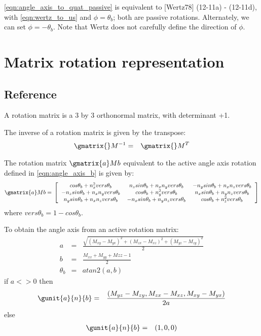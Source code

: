 \documentclass{book}
\numberwithin{equation}{subsection}
\begin{document}
\ref{eqn:angle_axis_to_quat_passive} is equivalent to [Wertz78]
(12-11a) - (12-11d), with \ref{eqn:wertz_to_us} and $\phi = \theta_b$;
both are passive rotations. Alternately, we can set $\phi = -
\theta_b$. Note that Wertz does not carefully define the direction of
$\phi$.

\section{Matrix rotation representation}
\subsection{Reference}
A rotation matrix is a 3 by 3 orthonormal matrix, with determinant +1.

The inverse of a rotation matrix is given by the transpose:
\begin{eqnarray}
\gmatrix{}M{}^{-1} &=& \gmatrix{}M{}^T 
\end{eqnarray}

The rotation matrix $\gmatrix{a}M{b}$ equivalent to the active angle axis rotation
defined in \ref{eqn:angle_axis_b} is given by:
\begin{equation}
\gmatrix{a}M{b} = \\
    \left[
        \begin{tabular}{ccc}
            $cos \theta_b + n_x^2 vers \theta_b$ &
            $n_z sin \theta_b + n_x n_y vers \theta_b$ &
            $- n_y sin \theta_b + n_x n_z vers \theta_b$ \\
            $- n_z sin \theta_b + n_x n_y vers \theta_b$ &
            $cos \theta_b + n_y^2 vers \theta_b$ &
            $n_x sin \theta_b + n_y n_z vers \theta_b$ \\
            $n_y sin \theta_b + n_x n_z vers \theta_b$ &
            $- n_x sin \theta_b + n_y n_z vers \theta_b$ & 
            $cos \theta_b + n_z^2 vers \theta_b$
        \end{tabular}
    \right]
\label{eqn:angle_axis_to_rot_mat}
\end{equation}
where $vers \theta_b = 1 - cos \theta_b$. 

To obtain the angle axis from an active rotation matrix:
\begin{eqnarray}
a &=& \frac {\sqrt{(M_{xy} - M_{yx})^2 + (M_{zx} - M_{xz})^2 + (M_{yz} - M_{zy})^2}}{2} \nonumber\\
b &=& \frac {M_{xx} + M_{yy} + M{zz} - 1}{2} \nonumber \\
\theta_b &=& atan2 (a, b) \nonumber
\end{eqnarray}
if $a <> 0$ then 
\begin{eqnarray}
\gunit{a}{n}{b} &=& \frac {(M_{yz} - M_{zy}, M_{zx} - M_{xz}, M_{xy} - M_{yx})}{2 a}
\label{eqn:rot_mat_to_angle_axis}
\end{eqnarray}
else 
\begin{eqnarray}
\gunit{a}{n}{b} &=& (1, 0, 0) \nonumber
\end{eqnarray}
\end{document}
